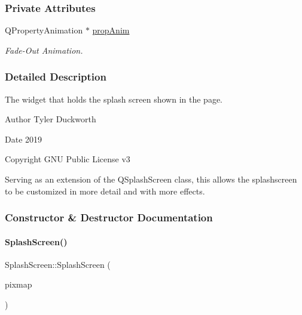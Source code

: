\subsubsection*{Private Attributes}
\begin{DoxyCompactItemize}
\item 
Q\+Property\+Animation $\ast$ \mbox{\hyperlink{classSplashScreen_ad24181386e6732f6ce5d69e5ddc16cd9}{prop\+Anim}}
\begin{DoxyCompactList}\small\item\em Fade-\/\+Out Animation. \end{DoxyCompactList}\end{DoxyCompactItemize}


\subsubsection{Detailed Description}
The widget that holds the splash screen shown in the page. 

\begin{DoxyAuthor}{Author}
Tyler Duckworth 
\end{DoxyAuthor}
\begin{DoxyDate}{Date}
2019 
\end{DoxyDate}
\begin{DoxyCopyright}{Copyright}
G\+NU Public License v3
\end{DoxyCopyright}
Serving as an extension of the Q\+Splash\+Screen class, this allows the splashscreen to be customized in more detail and with more effects. 

\subsubsection{Constructor \& Destructor Documentation}
\mbox{\label{classSplashScreen_a25b099ed5f03150091a21ba6fd83fa39}} 
\paragraph{\texorpdfstring{SplashScreen()}{SplashScreen()}}
{\footnotesize\ttfamily Splash\+Screen\+::\+Splash\+Screen (\begin{DoxyParamCaption}\item[{const Q\+Pixmap \&}]{pixmap }\end{DoxyParamCaption})\hspace{0.3cm}{\ttfamily [explicit]}}

